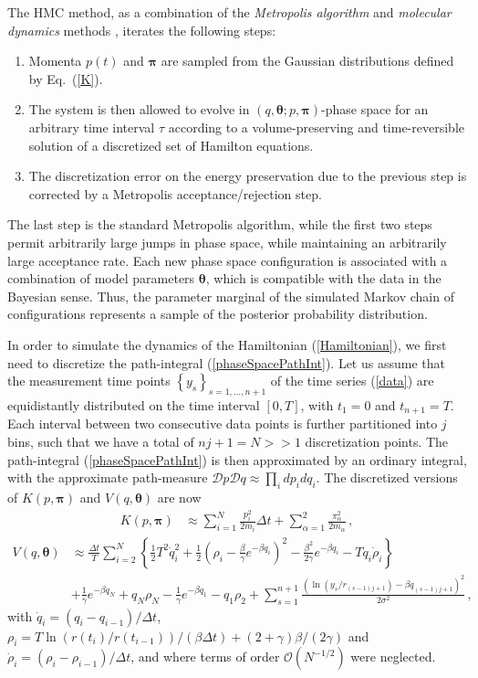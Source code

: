 \documentclass[11pt]{article}
\theoremstyle{definition}
\newcommand{\bt}{\pmb\theta}
\begin{document}
The HMC method, as a combination of the {\em Metropolis algorithm} \cite{metropolis_1953} and {\em molecular dynamics} methods \cite{alder_1959_MD, rahman_1964_MD}, iterates the following steps:
\begin{enumerate}
  \item
  Momenta $p(t)$ and ${\pmb\pi}$ are sampled from the Gaussian distributions defined by Eq.~(\ref{K}).
  \item
  The system is then allowed to evolve in $\left(q,\bt; p,{\pmb\pi}\right)$-phase space for an arbitrary time interval $\tau$ according to a volume-preserving and time-reversible solution of a discretized set of Hamilton equations.
  \item
  The discretization error on the energy preservation due to the previous step is corrected by a Metropolis acceptance/rejection step.
\end{enumerate}
The last step is the standard Metropolis algorithm, while the first two steps permit arbitrarily large jumps in phase space, while maintaining an arbitrarily large acceptance rate. Each new phase space configuration is associated with a combination of model parameters $\bt$, which is compatible with the data in the Bayesian sense. Thus, the parameter marginal of the simulated Markov chain of configurations represents a sample of the posterior probability distribution.

In order to simulate the dynamics of the Hamiltonian (\ref{Hamiltonian}), we first need to discretize the path-integral (\ref{phaseSpacePathInt}).
Let us assume that the measurement time points $\left\{ y_s \right\}_{s=1,\dots, n+1}$ of the time series (\ref{data}) are equidistantly distributed on the time interval $[0,T]$, with $t_1=0$ and $t_{n+1}=T$.
Each interval between two consecutive data points is further partitioned into $j$ bins, such that we have a total of $nj+1=N>>1$ discretization points.
The path-integral (\ref{phaseSpacePathInt}) is then approximated by an ordinary integral, with the approximate path-measure $  \mathcal Dp\mathcal Dq  \approx  \prod_i dp_i dq_i$.
The discretized versions of $K( p,{\pmb\pi})$ and $V( q,\bt)$ are now
\begin{align}
   K( p,{\pmb\pi}) &\approx
   \sum_{i=1}^N
   \frac{ p_i^2}{2m_i}\Delta t
   +
   \sum_{\alpha=1}^2\frac{\pi_\alpha^2}{2m_\alpha}\,,\label{Kdisc}
\end{align}
\begin{align} \label{Vdisc}
  V(q,\bt)  &\approx \frac{\Delta t}{T} \sum_{i=2}^{N}
   \left\{ \frac{1}{2} T^2 \dot q_i^2 + \frac{1}{2}
     \left( \rho_i-\frac{\beta}{\gamma}e^{-\beta q_i} \right)^2 -
    \frac{\beta^2}{2\gamma} e^{-\beta q_i} - T q_i\dot\rho_i \right\} 
  \\ \nonumber 
  &+
  \frac{1}{\gamma} e^{-\beta q_N} + q_N \rho_{N} - \frac{1}{\gamma} e^{-\beta q_1} -  q_1 \rho_{2} +
  \sum_{s=1}^{n+1} \frac{(\ln(y_s/r_{(s-1)j+1}) - {\beta q_{(s-1)j+1}})^2}{2\sigma^2}\,,
\end{align}
with $\dot q_i = (q_i-q_{i-1})/\Delta t$, $\rho_i = T \ln(r(t_{i})/r(t_{i-1}))/(\beta\Delta t)+(2+\gamma)\beta/(2\gamma)$ and $\dot\rho_i = (\rho_i-\rho_{i-1})/\Delta t$, and where terms of order $\mathcal O(N^{-1/2})$ were neglected.
\end{document}
